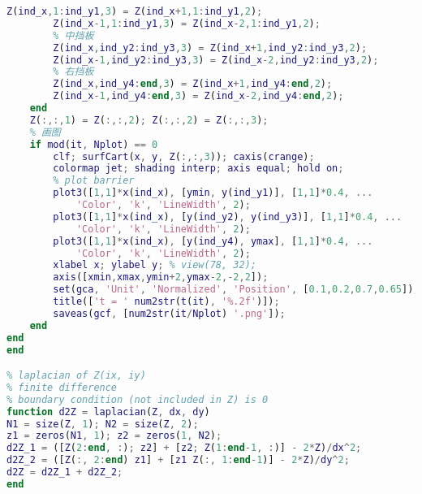\begin{lstlisting}[language=matlab, caption=double\_slit.m]
        Z(ind_x,1:ind_y1,3) = Z(ind_x+1,1:ind_y1,2);
        Z(ind_x-1,1:ind_y1,3) = Z(ind_x-2,1:ind_y1,2);
        % 中挡板
        Z(ind_x,ind_y2:ind_y3,3) = Z(ind_x+1,ind_y2:ind_y3,2);
        Z(ind_x-1,ind_y2:ind_y3,3) = Z(ind_x-2,ind_y2:ind_y3,2);
        % 右挡板
        Z(ind_x,ind_y4:end,3) = Z(ind_x+1,ind_y4:end,2);
        Z(ind_x-1,ind_y4:end,3) = Z(ind_x-2,ind_y4:end,2);
    end
    Z(:,:,1) = Z(:,:,2); Z(:,:,2) = Z(:,:,3);
    % 画图
    if mod(it, Nplot) == 0
        clf; surfCart(x, y, Z(:,:,3)); caxis(crange);
        colormap jet; shading interp; axis equal; hold on;
        % plot barrier
        plot3([1,1]*x(ind_x), [ymin, y(ind_y1)], [1,1]*0.4, ...
            'Color', 'k', 'LineWidth', 2);
        plot3([1,1]*x(ind_x), [y(ind_y2), y(ind_y3)], [1,1]*0.4, ...
            'Color', 'k', 'LineWidth', 2);
        plot3([1,1]*x(ind_x), [y(ind_y4), ymax], [1,1]*0.4, ...
            'Color', 'k', 'LineWidth', 2);
        xlabel x; ylabel y; % view(78, 32);
        axis([xmin,xmax,ymin+2,ymax-2,-2,2]);
        set(gca, 'Unit', 'Normalized', 'Position', [0.1,0.2,0.7,0.65]);
        title(['t = ' num2str(t(it), '%.2f')]);
        saveas(gcf, [num2str(it/Nplot) '.png']);
    end
end
end

% laplacian of Z(ix, iy)
% finite difference
% boundary condition (not included in Z) is 0
function d2Z = laplacian(Z, dx, dy)
N1 = size(Z, 1); N2 = size(Z, 2);
z1 = zeros(N1, 1); z2 = zeros(1, N2);
d2Z_1 = ([Z(2:end, :); z2] + [z2; Z(1:end-1, :)] - 2*Z)/dx^2;
d2Z_2 = ([Z(:, 2:end) z1] + [z1 Z(:, 1:end-1)] - 2*Z)/dy^2;
d2Z = d2Z_1 + d2Z_2;
end
\end{lstlisting}
